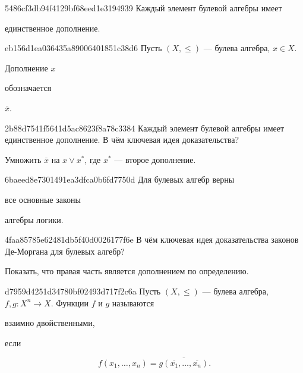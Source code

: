 \begin{note}{5486cf3db94f4129bf68eed1e3194939}
    Каждый элемент булевой алгебры имеет \begin{icloze}{1}единственное дополнение.\end{icloze}
\end{note}

\begin{note}{eb156d1ea036435a89006401851c38d6}
    Пусть \({ (X, \leqslant) }\) --- булева алгебра,\: \({ x \in X }\).
    \begin{icloze}{2}Дополнение \({ x }\)\end{icloze} обозначается \begin{icloze}{1}\({ \overline{x} }\).\end{icloze}
\end{note}

\begin{note}{2b88d7541f5641d5ac8623f8a78c3384}
    Каждый элемент булевой алгебры имеет единственное дополнение.
    В чём ключевая идея доказательства?

    \begin{cloze}{1}
        Умножить \({ \overline{x} }\) на \({ x \lor x^* }\), где \({ x^* }\) --- второе дополнение.
    \end{cloze}
\end{note}

\begin{note}{6baeed8e7301491ea3dfca0b6fd7750d}
    Для булевых алгебр верны \begin{icloze}{1}все основные законы\end{icloze} алгебры логики.
\end{note}

\begin{note}{4faa85785e62481db5f40d0026177f6e}
    В чём ключевая идея доказательства законов Де-Моргана для булевых алгебр?

    \begin{cloze}{1}
        Показать, что правая часть является дополнением по определению.
    \end{cloze}
\end{note}

\begin{note}{d7959d4251d34780bf02493d717f2c6a}
    Пусть \({ (X, \leqslant) }\) --- булева алгебра,\: \({ f, g : X^{n} \to X }\).
    Функции \({ f }\) и \({ g }\) называются \begin{icloze}{2}взаимно двойственными,\end{icloze} если
    \begin{icloze}{1}
        \[
            f(x_1, \ldots, x_n) = \overline{g(\overline{x_1}, \ldots, \overline{x_n})}.
        \]
    \end{icloze}
\end{note}

